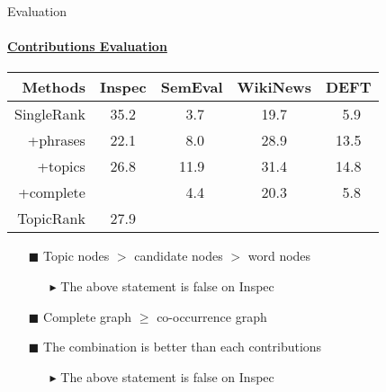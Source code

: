   \begin{frame}[label=contributions_evaluation]{Evaluation}
    \framesubtitle{\hyperlink{contributions_evaluation_backup}{Contributions Evaluation}}
    
    \begin{center}
      \begin{tabular}{rcccc}
        \toprule
        Methods & Inspec & SemEval & WikiNews & DEFT\\
        \midrule
        SingleRank & 35.2 & $~~$3.7 & 19.7 & $~~$5.9\\
        +phrases & 22.1 & $~~$8.0 & 28.9 & 13.5\\
        +topics & 26.8 & 11.9 & 31.4 & 14.8\\
        +complete &  \cellcolor{pink}{35.5} & $~~$4.4 & 20.3 & $~~$5.8\\
        TopicRank & 27.9 & \cellcolor{pink}{12.1} & \cellcolor{pink}{35.6} & \cellcolor{pink}{15.1}\\
        \bottomrule
      \end{tabular}
    \end{center}

    \begin{itemize}
      \item[\footnotesize\color{green}$\blacksquare$]{Topic nodes $>$ candidate
                                                      nodes $>$ word nodes}
      \begin{itemize}
        \item[\scriptsize\color{red}$\blacktriangleright$]{The above statement
                                                           is false on Inspec}
      \end{itemize}
      \item[\footnotesize\color{green}$\blacksquare$]{Complete graph $\geq$
                                                      co-occurrence graph}
      \item[\footnotesize\color{green}$\blacksquare$]{The combination is better
                                                      than each contributions}
      \begin{itemize}
        \item[\scriptsize\color{red}$\blacktriangleright$]{The above statement
                                                           is false on Inspec}
      \end{itemize}
    \end{itemize}
  \end{frame}

